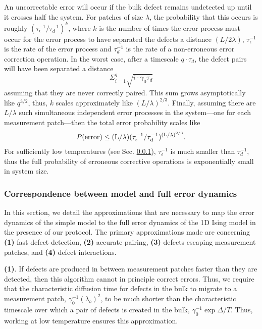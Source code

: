 \documentclass[twocolumn,superscriptaddress,aps,prb,floatfix]{revtex4-1}
\begin{document}
 An uncorrectable error will occur if the bulk defect remains undetected up until it crosses half the system.  For patches of size $\lambda$, the probability that this occurs is roughly $(\tau_{\epsilon}^{-1} / \tau_d^{-1})^{k}$, where $k$ is the number of times the error process must occur for the error process to have separated the defects a distance $(L/2\lambda)$, $\tau_{\epsilon}^{-1}$ is the rate of the error process and $\tau_d^{-1}$ is the rate of a non-erroneous error correction operation.  In the worst case, after a timescale $q\cdot\tau_{d}$, the defect pairs will have been separated a distance 
\begin{equation}  
\Sigma^q_{i=1} \sqrt{i \cdot \gamma_0 \tau_{d}}
\end{equation}
 assuming that they are never correctly paired.  This sum grows asymptotically like $q^{3/2}$, thus, $k$ scales approximately like $(L/\lambda)^{2/3}$.
Finally, assuming there are $L/\lambda$ such simultaneous independent error processes in the system---one for each measurement patch---then the total error probability scales like
\begin{align}
\label{eq:err_scaling}
 P(\rm{error})\leq (L/\lambda) (\tau_{\epsilon}^{-1} / \tau_d^{-1})^{(L/\lambda)^{2/3}}.
\end{align}
For sufficiently low temperatures (see Sec. \ref{sec:correspondence}), $\tau_{\epsilon}^{-1}$ is much smaller than $\tau_d^{-1}$, thus the full probability of erroneous corrective operations is exponentially small in system size.

 \subsubsection{Correspondence between model and full error dynamics}
 \label{sec:correspondence}
 
 In this section, we detail the approximations that are necessary to map the error dynamics of the simple model to the full error dynamics of the 1D Ising model in the presence of our protocol.  The primary approximations made are concerning \textbf{(1)} fast defect detection, \textbf{(2)} accurate pairing, \textbf{(3)} defects escaping measurement patches, and \textbf{(4)} defect interactions.
 
 \textbf{(1)}. If defects are produced in between measurement patches faster than they are detected, then this algorithm cannot in principle correct errors.  Thus, we require that the characteristic diffusion time for defects in the bulk to migrate to a measurement patch, $\gamma_0^{-1}(\lambda_b)^2$, to be much shorter than the characteristic timescale over which a pair of defects is created in the bulk, $\gamma_0^{-1} \exp{\Delta/T}$.  Thus, working at low temperature ensures this approximation.
 
\end{document}
